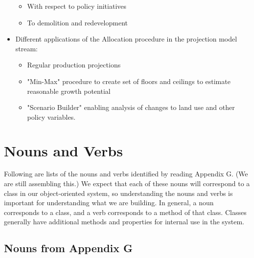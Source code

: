 \documentclass[titlepage]{article}
\begin{document}
\begin{itemize}
\begin{itemize}
\item With respect to policy initiatives
\item To demolition and redevelopment 
\end{itemize}
\item Different applications of the Allocation procedure in the projection model stream:
\begin{itemize}
\item Regular production projections
\item "Min-Max" procedure to create set of floors and ceilings to estimate reasonable growth potential
\item "Scenario Builder" enabling analysis of changes to land use and other policy variables. 
\end{itemize}
\end{itemize}



\section{Nouns and Verbs}

Following are lists of the nouns and verbs identified by reading Appendix G.  (We are still assembling this.)  We expect that each of these nouns will correspond to a class in our object-oriented system, so understanding the nouns and verbs is important for understanding what we are building.  In general, a noun corresponds to a class, and a verb corresponds to a method of that class.  Classes generally have additional methods and properties for internal use in the system.

\subsection{Nouns from Appendix G}
\end{document}
